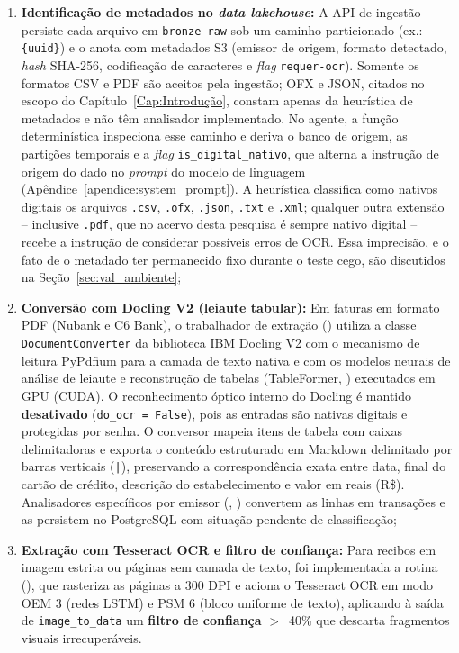 \begin{enumerate}
	\item \textbf{Identificação de metadados no \textit{data lakehouse}:} A API de ingestão persiste cada arquivo em \texttt{bronze-raw} sob um caminho particionado (ex.: \allowbreak\texttt{\{uuid\}}) e o anota com metadados S3 (emissor de origem, formato detectado, \textit{hash} SHA-256, codificação de caracteres e \textit{flag} \texttt{requer-ocr}). Somente os formatos CSV e PDF são aceitos pela ingestão; OFX e JSON, citados no escopo do Capítulo~\ref{Cap:Introdução}, constam apenas da heurística de metadados e não têm analisador implementado. No agente, a função determinística  inspeciona esse caminho e deriva o banco de origem, as partições temporais e a \textit{flag} \texttt{is\_digital\_nativo}, que alterna a instrução de origem do dado no \textit{prompt} do modelo de linguagem (Apêndice~\ref{apendice:system_prompt}). A heurística classifica como nativos digitais os arquivos \texttt{.csv}, \texttt{.ofx}, \texttt{.json}, \texttt{.txt} e \texttt{.xml}; qualquer outra extensão -- inclusive \texttt{.pdf}, que no acervo desta pesquisa é sempre nativo digital -- recebe a instrução de considerar possíveis erros de OCR. Essa imprecisão, e o fato de o metadado ter permanecido fixo durante o teste cego, são discutidos na Seção~\ref{sec:val_ambiente};
	\item \textbf{Conversão com Docling V2 (leiaute tabular):} Em faturas em formato PDF (Nubank e C6 Bank), o trabalhador de extração () utiliza a classe \texttt{Document\allowbreak Converter} da biblioteca IBM Docling V2 com o mecanismo de leitura PyPdfium para a camada de texto nativa e com os modelos neurais de análise de leiaute e reconstrução de tabelas (TableFormer, ) executados em GPU (CUDA). O reconhecimento óptico interno do Docling é mantido \textbf{desativado} (\texttt{do\_ocr = False}), pois as entradas são nativas digitais e protegidas por senha. O conversor mapeia itens de tabela com caixas delimitadoras e exporta o conteúdo estruturado em Markdown delimitado por barras verticais (\texttt{|}), preservando a correspondência exata entre data, final do cartão de crédito, descrição do estabelecimento e valor em reais (R\$). Analisadores específicos por emissor (, ) convertem as linhas em transações e as persistem no PostgreSQL com situação pendente de classificação;
	\item \textbf{Extração com Tesseract OCR e filtro de confiança:} Para recibos em imagem estrita ou páginas sem camada de texto, foi implementada a rotina  (), que rasteriza as páginas a 300 DPI e aciona o Tesseract OCR em modo OEM 3 (redes LSTM) e PSM 6 (bloco uniforme de texto), aplicando à saída de \texttt{image\_to\_data} um \textbf{filtro de confiança} $>$~40\% que descarta fragmentos visuais irrecuperáveis.
\end{enumerate}

